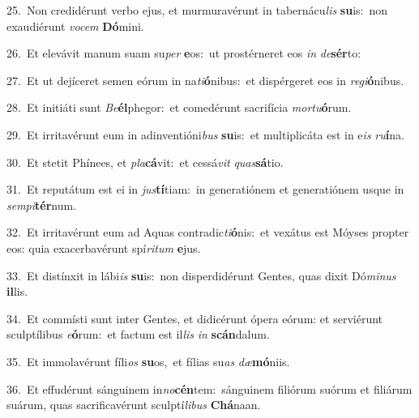 {\numbfont\textcolor{\numbcolor}{25.}}~Non credidérunt verbo ejus, et murmuravérunt in tabernácu\textit{lis} \textbf{su}\-is:~\star non exaudiérunt \textit{vo}\-\textit{cem} \textbf{Dó}\-mini.\par
{\numbfont\textcolor{\numbcolor}{26.}}~Et elevávit manum suam su\textit{per} \textbf{e}\-os:~\star ut prostérneret eos \textit{in} \textit{de}\-\textbf{sér}to:\par
{\numbfont\textcolor{\numbcolor}{27.}}~Et ut dejíceret semen eórum in na\-\textit{ti}\-\textbf{ó}nibus:~\star et dispérgeret eos in \textit{re}\-\textit{gi}\textbf{ó}nibus.\par
{\numbfont\textcolor{\numbcolor}{28.}}~Et initiáti sunt \textit{Be}\-\textbf{él}phegor:~\star et comedérunt sacrifícia \textit{mor}\-\textit{tu}\textbf{ó}rum.\par
{\numbfont\textcolor{\numbcolor}{29.}}~Et irritavérunt eum in adinventióni\textit{bus} \textbf{su}\-is:~\star et multiplicáta est in e\textit{is} \textit{ru}\-\textbf{í}na.\par
{\numbfont\textcolor{\numbcolor}{30.}}~Et stetit Phínees, et \textit{pla}\-\textbf{cá}vit:~\star et cessá\textit{vit} \textit{quas}\-\textbf{sá}tio.\par
{\numbfont\textcolor{\numbcolor}{31.}}~Et reputátum est ei in \textit{jus}\-\textbf{tí}tiam:~\star in generatiónem et generatiónem usque in \textit{sem}\-\textit{pi}\textbf{tér}num.\par
{\numbfont\textcolor{\numbcolor}{32.}}~Et irritavérunt eum ad Aquas contradic\-\textit{ti}\-\textbf{ó}nis:~\star et vexátus est Móyses propter eos: quia exacerbavérunt spí\-\textit{ri}\-\textit{tum} \textbf{e}\-jus.\par
{\numbfont\textcolor{\numbcolor}{33.}}~Et distínxit in lábi\textit{is} \textbf{su}\-is:~\star non disperdidérunt Gentes, quas dixit Dó\-\textit{mi}\-\textit{nus} \textbf{il}\-lis.\par
{\numbfont\textcolor{\numbcolor}{34.}}~Et commísti sunt inter Gentes, et didicérunt ópera eórum: et serviérunt sculptílibus \textit{e}\-\textbf{ó}rum:~\star et factum est il\textit{lis} \textit{in} \textbf{scán}\-dalum.\par
{\numbfont\textcolor{\numbcolor}{35.}}~Et immolavérunt fíli\textit{os} \textbf{su}\-os,~\star et fílias su\textit{as} \textit{dæ}\-\textbf{mó}niis.\par
{\numbfont\textcolor{\numbcolor}{36.}}~Et effudérunt sánguinem in\-\textit{no}\-\textbf{cén}tem:~\star sánguinem filiórum suórum et filiárum suárum, quas sacrificavérunt sculptí\-\textit{li}\-\textit{bus} \textbf{Chá}\-naan.\par
